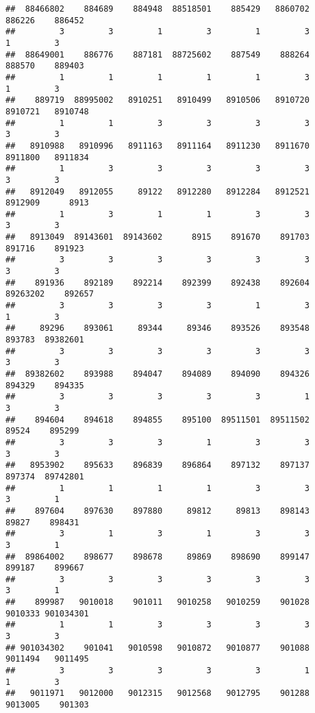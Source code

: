 \documentclass[
]{article}
\begin{document}
\begin{verbatim}
##  88466802    884689    884948  88518501    885429   8860702    886226    886452 
##         3         3         1         3         1         3         1         3 
##  88649001    886776    887181  88725602    887549    888264    888570    889403 
##         1         1         1         1         1         3         1         3 
##    889719  88995002   8910251   8910499   8910506   8910720   8910721   8910748 
##         1         1         3         3         3         3         3         3 
##   8910988   8910996   8911163   8911164   8911230   8911670   8911800   8911834 
##         1         3         3         3         3         3         3         3 
##   8912049   8912055     89122   8912280   8912284   8912521   8912909      8913 
##         1         3         1         1         3         3         3         3 
##   8913049  89143601  89143602      8915    891670    891703    891716    891923 
##         3         3         3         3         3         3         3         3 
##    891936    892189    892214    892399    892438    892604  89263202    892657 
##         3         3         3         3         1         3         1         3 
##     89296    893061     89344     89346    893526    893548    893783  89382601 
##         3         3         3         3         3         3         3         3 
##  89382602    893988    894047    894089    894090    894326    894329    894335 
##         3         3         3         3         3         1         3         3 
##    894604    894618    894855    895100  89511501  89511502     89524    895299 
##         3         3         3         1         3         3         3         3 
##   8953902    895633    896839    896864    897132    897137    897374  89742801 
##         1         1         1         1         3         3         3         1 
##    897604    897630    897880     89812     89813    898143     89827    898431 
##         3         1         3         1         3         3         3         1 
##  89864002    898677    898678     89869    898690    899147    899187    899667 
##         3         3         3         3         3         3         3         1 
##    899987   9010018    901011   9010258   9010259    901028   9010333 901034301 
##         1         1         3         3         3         3         3         3 
## 901034302    901041   9010598   9010872   9010877    901088   9011494   9011495 
##         3         3         3         3         3         1         1         3 
##   9011971   9012000   9012315   9012568   9012795    901288   9013005    901303 

\end{verbatim}
\end{document}
